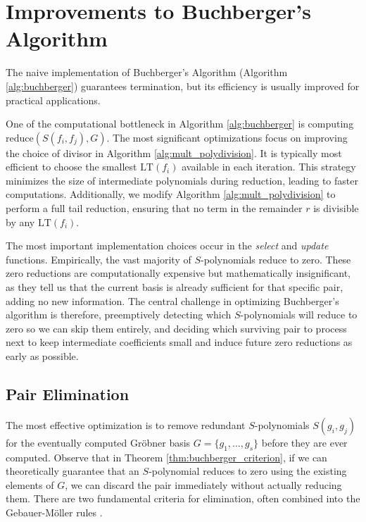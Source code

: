 \section{Improvements to Buchberger's Algorithm}
\label{sec:improvements_buchberger}

The naive implementation of Buchberger's Algorithm (Algorithm \ref{alg:buchberger}) guarantees termination, but its efficiency is usually improved for practical applications.

One of the computational bottleneck in Algorithm \ref{alg:buchberger} is computing $\text{reduce}(S(f_i, f_j), G)$. The most significant optimizations focus on improving the choice of divisor in Algorithm \ref{alg:mult_polydivision}. It is typically most efficient to choose the smallest $\text{LT}(f_i)$ available in each iteration. This strategy minimizes the size of intermediate polynomials during reduction, leading to faster computations. Additionally, we modify Algorithm \ref{alg:mult_polydivision} to perform a full tail reduction, ensuring that no term in the remainder $r$ is divisible by any $\text{LT}(f_i)$.

The most important implementation choices occur in the \textit{select} and \textit{update} functions. Empirically, the vast majority of $S$-polynomials reduce to zero. These zero reductions are computationally expensive but mathematically insignificant, as they tell us that the current basis is already sufficient for that specific pair, adding no new information. The central challenge in optimizing Buchberger's algorithm is therefore, preemptively detecting which $S$-polynomials will reduce to zero so we can skip them entirely, and deciding which surviving pair to process next to keep intermediate coefficients small and induce future zero reductions as early as possible.

\subsection{Pair Elimination}
\label{subsec:pair_elimination}

The most effective optimization is to remove redundant $S$-polynomials $S(g_i, g_j)$ for the eventually computed Gröbner basis $G = \{g_1, \ldots, g_s\}$ before they are ever computed. Observe that in Theorem \ref{thm:buchberger_criterion}, if we can theoretically guarantee that an $S$-polynomial reduces to zero using the existing elements of $G$, we can discard the pair immediately without actually reducing them. There are two fundamental criteria for elimination, often combined into the Gebauer-Möller rules \cite{Gebauer1988_InstallationOfGB}. 

